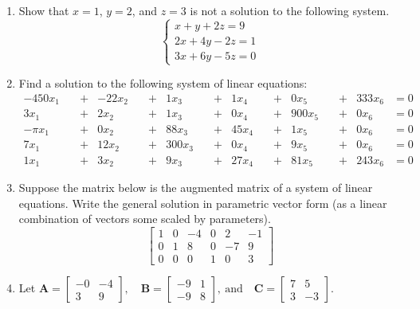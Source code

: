 \documentclass[basic]{inVerba-notes}
\begin{document}
\begin{enumerate}[align=left, leftmargin=0pt, labelindent=\parindent, listparindent=\parindent, labelwidth=0pt, itemindent=!]
  \newpage

  \item {} Show that \(x=1\), \(y=2\), and \(z=3\) is not a solution to the following system.
  \[%
  \begin{cases}
    x+y+2z=9\\
    2x+4y-2z=1\\
    3x+6y-5z=0
  \end{cases}
  \]%
  
  \item {} Find a solution to the following system of linear equations: 
  \begin{align*}
    -450x_1 & \quad + & -22x_2 & \quad + & 1x_3 & \quad + & 1x_4 & \quad + & 0x_5 & \quad + & 333x_6 &= 0 \\
    3x_1 & \quad + & 2x_2 & \quad + & 1x_3 & \quad + & 0x_4 & \quad + & 900x_5 & \quad + & 0x_6 &= 0 \\
    -\pi x_1 & \quad + & 0x_2 & \quad + & 88x_3 & \quad + & 45x_4 & \quad + & 1x_5 & \quad + & 0x_6 &= 0 \\
    7x_1 & \quad + & 12x_2 & \quad + & 300x_3 & \quad + & 0x_4 & \quad + & 9x_5 & \quad + & 0x_6 &= 0 \\
    1x_1 & \quad + & 3x_2 & \quad + & 9x_3 & \quad + & 27x_4 & \quad + & 81x_5 & \quad + & 243x_6 &= 0 
  \end{align*}
  
  
  \newpage 

  \item {} Suppose the matrix below is the augmented matrix of a system of linear equations. Write the general solution in parametric vector form (as a linear combination of vectors some scaled by parameters).
  \[%
  \begin{bmatrix}
  1 & 0 & -4 & 0 & 2 & -1  \\
  0 & 1 & 8 & 0 & -7 & 9  \\
  0 & 0 & 0 & 1 & 0 & 3  
  \end{bmatrix}
  \]%
  
  \item {} Let
  \(%
  \bm{A} = \begin{bmatrix} -0 & -4 \\ 3 & 9 \end{bmatrix},
  \quad \bm{B} = \begin{bmatrix} -9 & 1  \\ -9 & 8 \end{bmatrix},~\text{and}
  \quad \bm{C} = \begin{bmatrix} 7 & 5 \\ 3 & -3 \end{bmatrix}.
  \)%
  

\end{enumerate}
\end{document}

